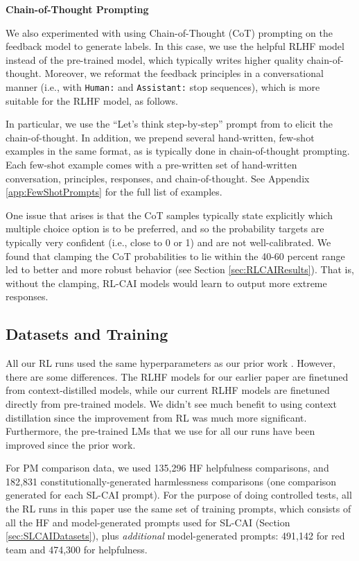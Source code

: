 {\bf Chain-of-Thought Prompting}

We also experimented with using Chain-of-Thought (CoT) prompting \cite{ChainOfThought} on the feedback model to generate labels. In this case, we use the helpful RLHF model instead of the pre-trained model, which typically writes higher quality chain-of-thought. Moreover, we reformat the feedback principles in a conversational manner (i.e., with \texttt{Human:} and \texttt{Assistant:} stop sequences), which is more suitable for the RLHF model, as follows.

In particular, we use the ``Let's think step-by-step'' prompt from \cite{StepByStep} to elicit the chain-of-thought. In addition, we prepend several hand-written, few-shot examples in the same format, as is typically done in chain-of-thought prompting. Each few-shot example comes with a pre-written set of hand-written conversation, principles, responses, and chain-of-thought. See Appendix \ref{app:FewShotPrompts} for the full list of examples.

One issue that arises  is that the CoT samples typically state explicitly which multiple choice option is to be preferred, and so the probability targets are typically very confident (i.e., close to 0 or 1) and are not well-calibrated.  We found that clamping the CoT probabilities to lie within the 40-60 percent range led to better and more robust behavior (see Section \ref{sec:RLCAIResults}).  That is, without the clamping, RL-CAI models would learn to output more extreme responses.

\subsection{Datasets and Training}

All our RL runs used the same hyperparameters as our prior work \cite{bai2022training}. However, there are some differences. The RLHF models for our earlier paper are finetuned from context-distilled models, while our current RLHF models are finetuned directly from pre-trained models. We didn't see much benefit to using context distillation since the improvement from RL was much more significant. Furthermore, the pre-trained LMs that we use for all our runs have been improved since the prior work.

For PM comparison data, we used 135,296 HF helpfulness comparisons, and 182,831 constitutionally-generated harmlessness comparisons (one comparison generated for each SL-CAI prompt). For the purpose of doing controlled tests, all the RL runs in this paper use the same set of training prompts, which consists of all the HF and model-generated prompts used for SL-CAI (Section \ref{sec:SLCAIDatasets}), plus {\it additional} model-generated prompts: 491,142 for red team and 474,300 for helpfulness. 

